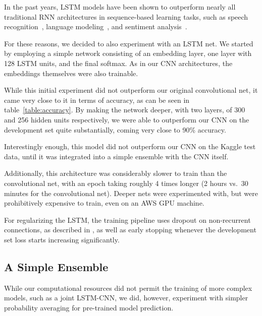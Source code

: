 \documentclass[10pt,conference,compsocconf]{IEEEtran}
\begin{document}
In the past years, LSTM
models have been shown to outperform nearly all traditional RNN architectures
in sequence-based learning tasks, such as
speech recognition~\cite{graves2013speech},
language modeling~\cite{sundermeyer2012lstm},
and sentiment analysis~\cite{zhao2016online}.

For these reasons, we decided to also experiment with an LSTM net.
We started by employing a simple network consisting of an embedding layer,
one layer with 128 LSTM units, and the final softmax. As in our CNN
architectures, the embeddings themselves were also trainable.

While this initial experiment did not outperform our original convolutional
net, it came very close to it in terms of accuracy, as can be seen in
table~\ref{table:accuracy}.
By making the network deeper, with two layers, of 300 and 256 hidden
units respectively, we were able to outperform our CNN on the development
set quite substantially, coming very close to 90\% accuracy.

Interestingly enough, this model did not outperform our CNN on the Kaggle
test data, until it was integrated into a simple ensemble with the
CNN itself.

Additionally, this architecture was considerably slower to train than
the convolutional net, with an epoch taking roughly 4 times longer (2 hours
vs.\ 30 minutes for the convolutional net). Deeper nets were experimented
with, but were prohibitively expensive to train, even on an AWS GPU machine.

For regularizing the LSTM, the training pipeline uses dropout
on non-recurrent connections, as
described in \cite{zaremba2014recurrent},
as well as early stopping whenever
the development set loss starts increasing significantly.



\subsection{A Simple Ensemble}
\label{sec:ensemble}

While our computational resources did not permit the training of more complex
models, such as a joint LSTM-CNN, we did, however, experiment with simpler
probability averaging for pre-trained model prediction.
\end{document}
